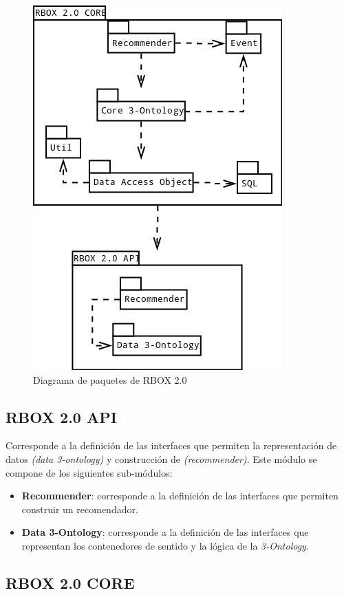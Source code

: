\begin{figure}[tp]
	\centering
	\includegraphics[scale=.6]{images/arquitectureRBOX2.png}
	\caption{Diagrama de paquetes de RBOX 2.0 }
	\label{fig:diagramapaquetes}
\end{figure}

\subsection{RBOX 2.0 API}

Corresponde a la definición de las interfaces  que permiten la representación de datos \textit{(data 3-ontology)} y construcción de  \textit{(recommender)}. Este módulo se compone de los siguientes sub-módulos:

\begin{itemize}
	\item \textbf{Recommender}: corresponde a la definición de las interfaces que permiten construir un recomendador.
	\item \textbf{Data 3-Ontology}: corresponde a la definición de las interfaces que representan los contenedores de sentido y la lógica de la \textit{3-Ontology}.
\end{itemize}

\subsection{RBOX 2.0 CORE}

